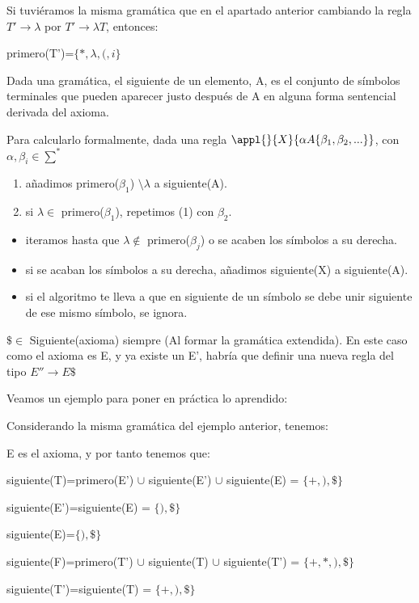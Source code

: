 \documentclass{apuntes}
\begin{document}
\begin{example}
Si tuviéramos la misma gramática que en el apartado anterior cambiando la regla $T' \rightarrow λ$ por $T' \rightarrow λT$, entonces:

primero(T')=$\{*,λ, (, i\}$
\end{example}



\begin{defn}[Siguiente(A)]
Dada una gramática, el siguiente de un elemento, A, es el conjunto de símbolos terminales que pueden aparecer justo después de A en alguna forma sentencial derivada del axioma.
\end{defn}

Para calcularlo formalmente, dada una regla $\appl{}{X}{\alpha A \{\beta_1,\beta_2,...\}}$, con $\alpha, \beta_i \in \sum^*$
\begin{enumerate}
\item añadimos primero($\beta_1$) $\setminus \lambda$  a siguiente(A).
\item si $\lambda \in$ primero($\beta_1$), repetimos (1) con $\beta_2$.
\end{enumerate}
\begin{itemize}
\item iteramos hasta que $\lambda \notin$ primero($\beta_j$) o se acaben los símbolos a su derecha.
\item si se acaban los símbolos a su derecha, añadimos siguiente(X) a siguiente(A).
\item si el algoritmo te lleva a que en siguiente de un símbolo se debe unir siguiente de ese mismo símbolo, se ignora.
\end{itemize}

\obs $\$ \in $ Siguiente(axioma) siempre (Al formar la gramática extendida). En este caso como el axioma es E, y ya existe un E', habría que definir una nueva regla del tipo $E'' \rightarrow E\$$

Veamos un ejemplo para poner en práctica lo aprendido:

\begin{example}
Considerando la misma gramática del ejemplo anterior, tenemos:

E es el axioma, y por tanto tenemos que:

siguiente(T)=primero(E') $\cup$ siguiente(E') $\cup$ siguiente(E) = $\{ +, ), \$\}$

siguiente(E')=siguiente(E) = $\{ ), \$ \}$

siguiente(E)=$\{ ), \$\}$

siguiente(F)=primero(T') $\cup$ siguiente(T) $\cup$ siguiente(T') = $\{ +, *, ), \$ \}$

siguiente(T')=siguiente(T) = $\{ +, ), \$ \}$
\end{example}
\end{document}
